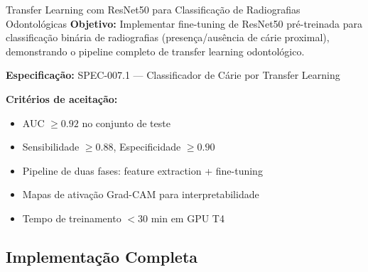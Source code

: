 \begin{pratica}{Transfer Learning com ResNet50 para Classificação de
Radiografias Odontológicas}
  \textbf{Objetivo:} Implementar fine-tuning de ResNet50 pré-treinada para
  classificação binária de radiografias (presença/ausência de cárie proximal),
  demonstrando o pipeline completo de transfer learning odontológico.

  \textbf{Especificação:} SPEC-007.1 --- Classificador de Cárie por Transfer Learning

  \textbf{Critérios de aceitação:}
  \begin{itemize}
    \item AUC $\geq 0.92$ no conjunto de teste
    \item Sensibilidade $\geq 0.88$, Especificidade $\geq 0.90$
    \item Pipeline de duas fases: feature extraction + fine-tuning
    \item Mapas de ativação Grad-CAM para interpretabilidade
    \item Tempo de treinamento $< 30$ min em GPU T4
  \end{itemize}
\end{pratica}

\subsection{Implementação Completa}

